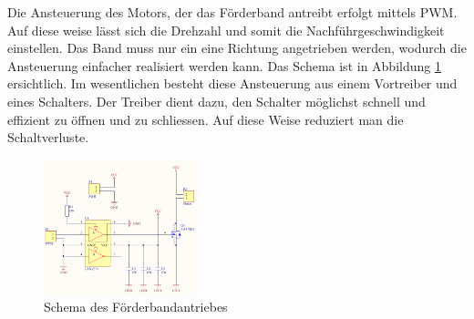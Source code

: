 \label{sec:Foerderband}
    Die Ansteuerung des Motors, der das Förderband antreibt erfolgt mittels PWM. Auf diese 
    weise lässt sich die Drehzahl und somit die Nachführgeschwindigkeit einstellen. Das 
    Band muss nur ein eine Richtung angetrieben werden, wodurch die Ansteuerung einfacher 
    realisiert werden kann. Das Schema ist in Abbildung \ref{abb:SchemaAnsteuerung} 
    ersichtlich. Im wesentlichen besteht diese Ansteuerung aus einem Vortreiber und eines 
    Schalters. Der Treiber dient dazu, den Schalter möglichst schnell und effizient zu 
    öffnen und zu schliessen. Auf diese Weise reduziert man die Schaltverluste. 
    \begin{figure}[h!]
    	\includegraphics[width=0.4\textwidth,clip,trim=0mm 0mm 0mm 0mm]
    	{Enddokumentation/Bilder/Schema_DC-Ansteuerung.png}
    	\centering
    	\caption{Schema des Förderbandantriebes}
    	\label{abb:SchemaAnsteuerung}
    \end{figure}
    
\newpage